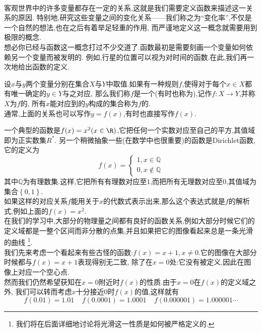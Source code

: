 \documentclass{ctexart}
\begin{document}
\pagestyle{plain}
\noindent{}\vspace{15pt}\\
\indent 客观世界中的许多变量都存在一定的关系,这就是我们需要定义函数来描述这一关系的原因.%
特别地,研究这些变量之间的变化关系——我们称之为“变化率”,不仅是一个自然的想法,也在之后有着举足轻重的作用,%
而严谨地定义这一概念就需要用到极限的概念.\vspace{12pt}\\
\indent 想必你已经与函数这一概念打过不少交道了.函数最初是需要刻画一个变量如何依赖另一个变量而被发明的.%
例如,行星的位置可以视为对时间的函数.在此,我们再一次地给出函数的定义.
\begin{definition}[0A.1.1 函数]
    设$x$与$y$两个变量分别在集合$X$与$Y$中取值.如果有一种规则$f$,使得对于每个$x\in X$都有唯一确定的$y\in Y$与之对应,%
    那么我们称$f$是一个(有时也称为),记作$f:X\to Y$,并称$X$为$f$的,%
    所有$x$能对应到的$y$构成的集合称为$f$的.\\
    通常,上面的关系也可以写作$y=f(x)$,有时也直接写作$f(x)$.
\end{definition}
一个典型的函数是$f(x)=x^2(x\in\R)$,它把任何一个实数对应至自己的平方,其值域即为正实数集$R^\ast$.%
另一个稍微抽象一些(在数学中也很重要)的函数是Dirichlet函数,它的定义为
\[f(x)=\left\{\begin{array}{l}
    1,x\in\mathbb{Q}\\0,x\notin\mathbb{Q}
\end{array}\right.\]
其中$\mathbb{Q}$为有理数集.这样,它把所有有理数对应至$1$,而把所有无理数对应至$0$,其值域为集合$\left\{0,1\right\}$.\\
\indent 如果这样的对应关系$f$能用关于$x$的代数式表示出来,那么这个表达式就是$f$的解析式,例如上面的$f(x)=x^2$.\\
\indent 在我们的学习中,大部分的物理量之间都有良好的函数关系,例如大部分时候它们的定义域都是一整个区间而非分散的点集,并且如果把它的图像看起来总是一条光滑的曲线%
\footnote{我们将在后面详细地讨论将光滑这一性质是如何被严格定义的.}.\vspace{12pt}\\
\indent 我们先来考虑一个看起来有些古怪的函数:$f(x)=x+1,x\neq0$.它的图像在大部分时候都与$f(x)=x+1$表现得别无二致,%
除了在$x=0$处:它没有被定义,因此在图像上对应一个空心点.\\
\indent 然而我们仍然希望获知在$x=0$附近时$f(x)$的性质.由于$x=0$在$f(x)$的定义域之外,%
我们可以转而考虑$x$十分接近$0$时$f(x)$的值,这样就有
\[f(0.01)=1.01\ \ \ \ \ f(0.0001)=1.0001\ \ \ \ \ f(0.000001)=1.000001\cdots\]
\end{document}
